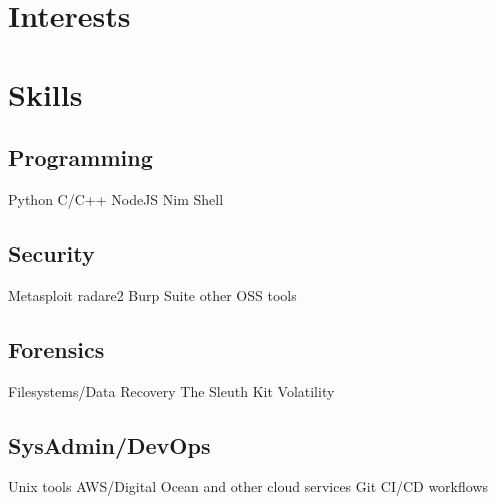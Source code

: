 \documentclass[]{resume-openfont}
\begin{document}
\begin{minipage}[t]{0.33\textwidth}
\vspace{6mm} %

\section{Interests}
\sectionsep


\vspace{6mm} %

\section{Skills}
\subsection{Programming}
Python \textbullet{} C/C++ \textbullet{} NodeJS \textbullet{} Nim \textbullet{} Shell
\sectionsep
\subsection{Security}
Metasploit \textbullet{} radare2 \textbullet{} Burp Suite \textbullet{} other OSS tools
\sectionsep
\subsection{Forensics}
Filesystems/Data Recovery \textbullet{} The Sleuth Kit \textbullet{} Volatility
\sectionsep
\subsection{SysAdmin/DevOps}
Unix tools \textbullet{} AWS/Digital Ocean and other cloud services \textbullet{} Git \textbullet{} CI/CD workflows
%
%

\end{minipage} 
\hfill
\end{document}

